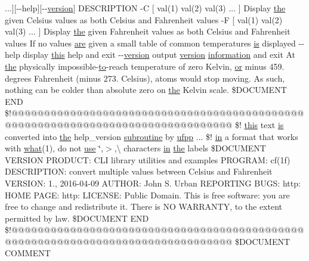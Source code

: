 ...\mbox{]}\mbox{[}-\/-\/help\mbox{]}\mbox{[}-\/-\/\hyperlink{inquiry__stopwatch_83_8txt_aee378be19d20935dd436517beda00ee4}{version}\mbox{]} D\+E\+S\+C\+R\+I\+P\+T\+I\+ON -\/C \mbox{[} val(1) val(2) val(3) ... \mbox{]} Display \hyperlink{M__stopwatch_83_8txt_a0f266597de2e57eb3aa964927bb30e14}{the} given Celsius values as both Celsius and Fahrenheit values -\/F \mbox{[} val(1) val(2) val(3) ... \mbox{]} Display \hyperlink{M__stopwatch_83_8txt_a0f266597de2e57eb3aa964927bb30e14}{the} given Fahrenheit values as both Celsius and Fahrenheit values If no values \hyperlink{M__stopwatch_83_8txt_a5040be02b832eba08820289c8a1f81c4}{are} given a small table of common temperatures \hyperlink{intro__blas1_83_8txt_a42a91df93f840595de3019ceb5d1df23}{is} displayed -\/-\/help display \hyperlink{M__stopwatch_83_8txt_ad62a52042bb610eee5b36b5516caec22}{this} help and exit -\/-\/\hyperlink{inquiry__stopwatch_83_8txt_aee378be19d20935dd436517beda00ee4}{version} output \hyperlink{inquiry__stopwatch_83_8txt_aee378be19d20935dd436517beda00ee4}{version} \hyperlink{M__stopwatch_83_8txt_a9f7f0ce21871efda7da3eda76d1d3cff}{information} and exit At \hyperlink{M__stopwatch_83_8txt_a0f266597de2e57eb3aa964927bb30e14}{the} physically impossible-\/\hyperlink{M__stopwatch_83_8txt_a97209fd3e34ef701c0a9734280779cbb}{to}-\/reach temperature of zero Kelvin, \hyperlink{what__overview_81_8txt_a08ee81dca94cf4ba88d4a64051e232d5}{or} minus 459. degrees Fahrenheit (minus 273. Celsius), atoms would stop moving. As such, nothing can be colder than absolute zero on \hyperlink{M__stopwatch_83_8txt_a0f266597de2e57eb3aa964927bb30e14}{the} Kelvin scale. \$D\+O\+C\+U\+M\+E\+NT E\+ND \$!@@@@@@@@@@@@@@@@@@@@@@@@@@@@@@@@@@@@@@@@@@@@@@@@@@@@@@@@@@@@@@@@@@@@@@@@@@@@@@@@ \$! \hyperlink{M__stopwatch_83_8txt_ad62a52042bb610eee5b36b5516caec22}{this} text \hyperlink{intro__blas1_83_8txt_a42a91df93f840595de3019ceb5d1df23}{is} converted into \hyperlink{M__stopwatch_83_8txt_a0f266597de2e57eb3aa964927bb30e14}{the} help\+\_\+version \hyperlink{M__stopwatch_83_8txt_acfbcff50169d691ff02d4a123ed70482}{subroutine} by \hyperlink{ufpp__overview_81_8txt_a97c20a96bcab81bc74c9d64b001f1202}{ufpp} ... \$! \hyperlink{M__journal_83_8txt_afce72651d1eed785a2132bee863b2f38}{in} a format that works with \hyperlink{what__overview_81_8txt_adadc702e2a3423fa136bfa5b1e01b511}{what}(1), do not \hyperlink{intro__blas1_83_8txt_a04fa2694d85f67a675bb3f45f7241f48}{use} \char`\"{},$>$,\textbackslash{} characters \hyperlink{M__journal_83_8txt_afce72651d1eed785a2132bee863b2f38}{in} \hyperlink{M__stopwatch_83_8txt_a0f266597de2e57eb3aa964927bb30e14}{the} labels \$D\+O\+C\+U\+M\+E\+NT V\+E\+R\+S\+I\+ON P\+R\+O\+D\+U\+C\+T\+: C\+LI library utilities and examples P\+R\+O\+G\+R\+A\+M\+: cf(1f) D\+E\+S\+C\+R\+I\+P\+T\+I\+O\+N\+: convert multiple values between Celsius and Fahrenheit V\+E\+R\+S\+I\+O\+N\+: 1., 2016-\/04-\/09 A\+U\+T\+H\+O\+R\+: John S. Urban R\+E\+P\+O\+R\+T\+I\+N\+G B\+U\+G\+S\+: http\+: H\+O\+M\+E P\+A\+G\+E\+: http\+: L\+I\+C\+E\+N\+S\+E\+: Public Domain. This is free software\+: you are free to change and redistribute it. There is N\+O W\+A\+R\+R\+A\+N\+T\+Y, to the extent permitted by law. \$\+D\+O\+C\+U\+M\+E\+N\+T E\+N\+D \$!@@@@@@@@@@@@@@@@@@@@@@@@@@@@@@@@@@@@@@@@@@@@@@@@@@@@@@@@@@@@@@@@@@@@@@@@@@@@@@@@ \$\+D\+O\+C\+U\+M\+E\+N\+T C\+O\+M\+M\+E\+N\+T 